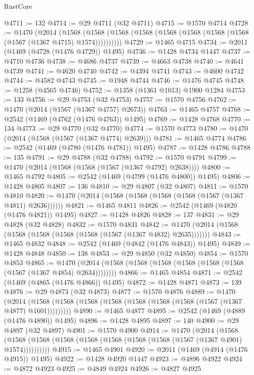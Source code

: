 \begin{lexlean}{RustCore}
\begin{coremodule}
{\begin{coremodule}
{{{{{{{{{{{{{{{{{{{{{{{{{{{{{{{{{{{{{{{{{{{{{{{@4711 := 132
@4714 := @29 @4711 (@32 @4711)
@4715 := @1570 @4714
@4728 := @1470
    (@2014
      (@1568 (@1568 (@1568 (@1568 (@1568 (@1568 (@1568 (@1568 (@1567 (@1367 @4715) @1574))))))))))
@4729 := @1465 @4715
@4734 := @2011 (@1469 (@4728 (@1476 @4729)) @1495)
@4736 := @1428 @4734 @1447
@4737 := @4710 @4736
@4738 := @4686 @4737
@4739 := @4663 @4738
@4740 := @4641 @4739
@4741 := @4620 @4740
@4742 := @4394 @4741
@4743 := @4600 @4742
@4744 := @4582 @4743
@4745 := @1948 @4744
@4746 := @1476 @4745
@4748 := @1258 (@4565 @4746)
@4752 := @1358 (@1361 @1013) @1900 @1284
@4753 := 133
@4756 := @29 @4753 (@32 @4753)
@4757 := @1570 @4756
@4762 := @1470 (@2014 (@1567 (@1367 @4757) @2673))
@4763 := @1465 @4757
@4768 := @2542 (@1469 (@4762 (@1476 @4763)) @1495)
@4769 := @1428 @4768
@4770 := 134
@4773 := @29 @4770 (@32 @4770)
@4774 := @1570 @4773
@4780 := @1470 (@2014 (@1568 (@1567 (@1367 @4774) @2639)))
@4781 := @1465 @4774
@4786 := @2542 (@1469 (@4780 (@1476 @4781)) @1495)
@4787 := @1428 @4786
@4788 := 135
@4791 := @29 @4788 (@32 @4788)
@4792 := @1570 @4791
@4799 := @1470 (@2014 (@1568 (@1568 (@1567 (@1367 @4792) @2638))))
@4800 := @1465 @4792
@4805 := @2542 (@1469 (@4799 (@1476 @4800)) @1495)
@4806 := @1428 @4805
@4807 := 136
@4810 := @29 @4807 (@32 @4807)
@4811 := @1570 @4810
@4820 := @1470 (@2014 (@1568 (@1568 (@1568 (@1568 (@1567 (@1367 @4811) @2636))))))
@4821 := @1465 @4811
@4826 := @2542 (@1469 (@4820 (@1476 @4821)) @1495)
@4827 := @1428 @4826
@4828 := 137
@4831 := @29 @4828 (@32 @4828)
@4832 := @1570 @4831
@4842 := @1470 (@2014 (@1568 (@1568 (@1568 (@1568 (@1568 (@1567 (@1367 @4832) @2635)))))))
@4843 := @1465 @4832
@4848 := @2542 (@1469 (@4842 (@1476 @4843)) @1495)
@4849 := @1428 @4848
@4850 := 138
@4853 := @29 @4850 (@32 @4850)
@4854 := @1570 @4853
@4865 := @1470 (@2014 (@1568 (@1568 (@1568 (@1568 (@1568 (@1568 (@1567 (@1367 @4854) @2634))))))))
@4866 := @1465 @4854
@4871 := @2542 (@1469 (@4865 (@1476 @4866)) @1495)
@4872 := @1428 @4871
@4873 := 139
@4876 := @29 @4873 (@32 @4873)
@4877 := @1570 @4876
@4889 := @1470
    (@2014 (@1568 (@1568 (@1568 (@1568 (@1568 (@1568 (@1568 (@1567 (@1367 @4877) @1601)))))))))
@4890 := @1465 @4877
@4895 := @2542 (@1469 (@4889 (@1476 @4890)) @1495)
@4896 := @1428 @4895
@4897 := 140
@4900 := @29 @4897 (@32 @4897)
@4901 := @1570 @4900
@4914 := @1470
    (@2014
      (@1568 (@1568 (@1568 (@1568 (@1568 (@1568 (@1568 (@1568 (@1567 (@1367 @4901) @1574))))))))))
@4915 := @1465 @4901
@4920 := @2011 (@1469 (@4914 (@1476 @4915)) @1495)
@4922 := @1428 @4920 @1447
@4923 := @4896 @4922
@4924 := @4872 @4923
@4925 := @4849 @4924
@4926 := @4827 @4925
}}}}}}}}}}}}}}}}}}}}}}}}}}}}}}}}}}}}}}}}}}}}}}}
\end{coremodule}}
\end{coremodule}
\end{lexlean}
